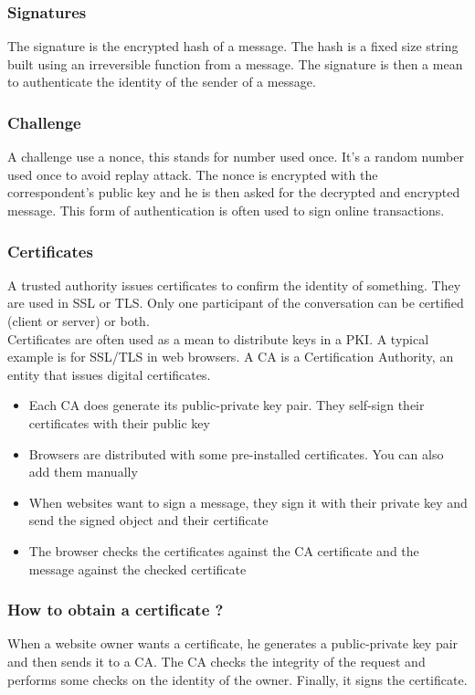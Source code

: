 \subsubsection{Signatures}
The signature is the encrypted hash of a message.
The hash is a fixed size string built using an irreversible function from a message.
The signature is then a mean to authenticate the identity of the sender of a message.
\subsubsection{Challenge}
A challenge use a nonce, this stands for number used once.
It's a random number used once to avoid replay attack.
The nonce is encrypted with the correspondent's public key and he is then asked for the decrypted and encrypted message.
This form of authentication is often used to sign online transactions.
\subsubsection{Certificates}
A trusted authority issues certificates to confirm the identity of something. They are used in SSL or TLS.
Only one participant of the conversation can be certified (client or server) or both.\\
Certificates are often used as a mean to distribute keys in a PKI. A typical example is for SSL/TLS in web browsers. A CA is a Certification Authority, an entity that issues digital certificates.
\begin{itemize}
\item Each CA does generate its public-private key pair. They self-sign their certificates with their public key
\item Browsers are distributed with some pre-installed certificates. You can also add them manually
\item When websites want to sign a message, they sign it with their private key and send the signed object and their certificate
\item The browser checks the certificates against the CA certificate and the message against the checked certificate
\end{itemize}
\subsubsection*{How to obtain a certificate ?}
When a website owner wants a certificate, he generates a public-private key pair and then sends it to a CA.
The CA checks the integrity of the request and performs some checks on the identity of the owner. Finally, it signs the certificate.

